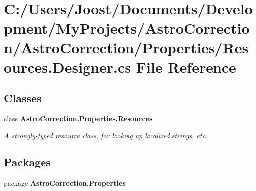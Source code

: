 \section{C:/Users/Joost/Documents/Development/MyProjects/AstroCorrection/AstroCorrection/Properties/Resources.Designer.cs File Reference}
\label{_resources_8_designer_8cs}
\subsection*{Classes}
\begin{DoxyCompactItemize}
\item 
class {\bf AstroCorrection.Properties.Resources}
\begin{DoxyCompactList}\small\item\em A strongly-\/typed resource class, for looking up localized strings, etc. \item\end{DoxyCompactList}\end{DoxyCompactItemize}
\subsection*{Packages}
\begin{DoxyCompactItemize}
\item 
package {\bf AstroCorrection.Properties}
\end{DoxyCompactItemize}

